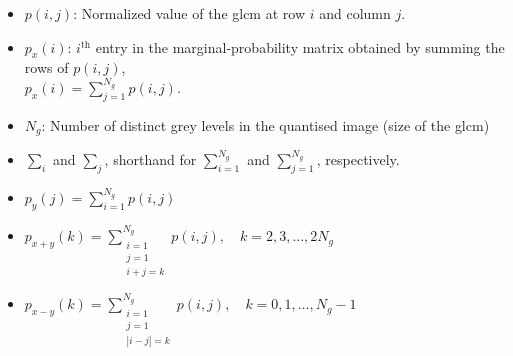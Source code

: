 \begin{itemize}

  \item $p(i,j)$: Normalized value of the \ac{glcm} at row $i$ and column $j$.
  
  \item $p_x(i)$: $i$$^{\text{th}}$ entry in the marginal-probability matrix obtained by summing the rows of $p(i,j)$,\\
  $p_x(i) = \sum_{j=1}^{N_g} p(i,j)$.
  
  \item $N_g$: Number of distinct grey levels  in the quantised
 image (size of the \ac{glcm})
  
  \item $\sum_i$ and $\sum_j$, shorthand for $\sum_{i=1}^{N_g}$ and $\sum_{j=1}^{N_g}$, respectively.
  
  \item $p_y(j) = \sum_{i=1}^{N_g} p(i,j)$
  
  \item $p_{x+y}(k) = \sum_{\substack{i=1 \\ j=1 \\ i+j=k}}^{N_g} p(i,j), \quad k = 2,3,\ldots,2N_g$
  
  \item $p_{x-y}(k) = \sum_{\substack{i=1 \\ j=1 \\ |i-j| = k}}^{N_g} p(i,j), \quad k = 0,1,\ldots,N_g - 1$
\end{itemize}


